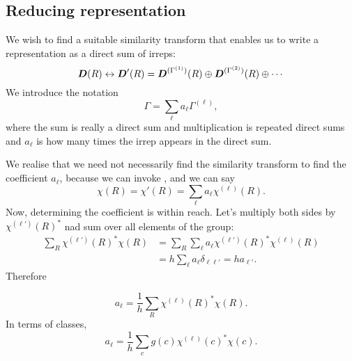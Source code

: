 \subsection{Reducing representation}
We wish to find a suitable similarity transform that enables us to write a 
representation as a direct sum of irreps:
\begin{equation}
\boldsymbol{D}(R)\leftrightarrow \boldsymbol{D}'(R)=\boldsymbol{D}^{(\Gamma^{(1)})}(R)\oplus\boldsymbol{D}^{(\Gamma^{(2)})}(R)\oplus\cdots
\end{equation}
We introduce the notation
\begin{equation}
\Gamma=\sum_{\ell}a_{\ell}\Gamma^{(\ell)}, 
\end{equation}
where the sum is really a direct sum and multiplication is repeated direct sums 
and $a_{\ell}$ is how many times the irrep appears in the direct sum. \par
We realise that we need not necessarily find the similarity transform to find 
the coefficient $a_{\ell}$, because we can invoke , and we can say 
\begin{equation}
\chi(R)=\chi'(R)=\sum_{\ell}a_{\ell}\chi^{(\ell)}(R).
\end{equation}
Now, determining the coefficient is within reach. Let's multiply both sides by 
$\chi^{(\ell')}(R)^*$ nad sum over all elements of the group: 
\begin{equation}
\begin{aligned}
\sum_R\chi^{(\ell')}(R)^*\chi(R)&=\sum_R\sum_{\ell}a_{\ell}\chi^{(\ell')}(R)^*\chi^{(\ell)}(R)\\
&=h\sum_{\ell}a_{\ell}\delta_{\ell\ell'}=ha_{\ell'}.
\end{aligned}
\end{equation}
Therefore
\begin{thrm}
\begin{equation}
a_{\ell}=\frac{1}{h}\sum_{R}\chi^{(\ell)}(R)^*\chi(R).
\end{equation}
In terms of classes, 
\begin{equation}
a_{\ell}=\frac{1}{h}\sum_c g(c)\chi^{(\ell)}(c)^*\chi(c).
\end{equation}
\end{thrm}
